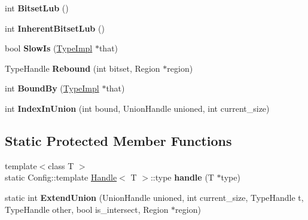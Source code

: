 \begin{DoxyCompactItemize}
\item 
\hypertarget{classv8_1_1internal_1_1_type_impl_ad9e16597f25d020ce03f2c2995d92eed}{}int {\bfseries Bitset\+Lub} ()\label{classv8_1_1internal_1_1_type_impl_ad9e16597f25d020ce03f2c2995d92eed}

\item 
\hypertarget{classv8_1_1internal_1_1_type_impl_af6399159d4f36facf524b38d496e380d}{}int {\bfseries Inherent\+Bitset\+Lub} ()\label{classv8_1_1internal_1_1_type_impl_af6399159d4f36facf524b38d496e380d}

\item 
\hypertarget{classv8_1_1internal_1_1_type_impl_a8842a87a6545937aee73b39f496ac186}{}bool {\bfseries Slow\+Is} (\hyperlink{classv8_1_1internal_1_1_type_impl}{Type\+Impl} $\ast$that)\label{classv8_1_1internal_1_1_type_impl_a8842a87a6545937aee73b39f496ac186}

\item 
\hypertarget{classv8_1_1internal_1_1_type_impl_a4ebc718b9bb2d29f2a3025c29f087a1f}{}Type\+Handle {\bfseries Rebound} (int bitset, Region $\ast$region)\label{classv8_1_1internal_1_1_type_impl_a4ebc718b9bb2d29f2a3025c29f087a1f}

\item 
\hypertarget{classv8_1_1internal_1_1_type_impl_af21efd162d1a54dad92a248087ae4628}{}int {\bfseries Bound\+By} (\hyperlink{classv8_1_1internal_1_1_type_impl}{Type\+Impl} $\ast$that)\label{classv8_1_1internal_1_1_type_impl_af21efd162d1a54dad92a248087ae4628}

\item 
\hypertarget{classv8_1_1internal_1_1_type_impl_a2bccbeeccbee07ab51b2d33d644dd19b}{}int {\bfseries Index\+In\+Union} (int bound, Union\+Handle unioned, int current\+\_\+size)\label{classv8_1_1internal_1_1_type_impl_a2bccbeeccbee07ab51b2d33d644dd19b}

\end{DoxyCompactItemize}
\subsection*{Static Protected Member Functions}
\begin{DoxyCompactItemize}
\item 
\hypertarget{classv8_1_1internal_1_1_type_impl_a31f432d3e3901d5cde9b07678791e11c}{}{\footnotesize template$<$class T $>$ }\\static Config\+::template \hyperlink{classv8_1_1internal_1_1_handle}{Handle}$<$ T $>$\+::type {\bfseries handle} (T $\ast$type)\label{classv8_1_1internal_1_1_type_impl_a31f432d3e3901d5cde9b07678791e11c}

\item 
\hypertarget{classv8_1_1internal_1_1_type_impl_afe835a9cfc9b9b24bee0cff1df3955cb}{}static int {\bfseries Extend\+Union} (Union\+Handle unioned, int current\+\_\+size, Type\+Handle t, Type\+Handle other, bool is\+\_\+intersect, Region $\ast$region)\label{classv8_1_1internal_1_1_type_impl_afe835a9cfc9b9b24bee0cff1df3955cb}

\end{DoxyCompactItemize}

